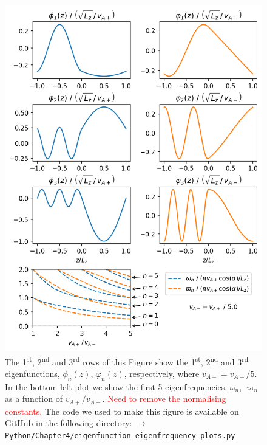 \begin{figure}
    \centering
    \vspace{-20pt}
    \includegraphics[width=\textwidth,height=0.9\textheight,keepaspectratio]{figures/chapter04/eigenfunctions_and_eigenfrequencies.png}
    \vspace{-10pt}
    \caption{The 1\textsuperscript{st}, 2\textsuperscript{nd} and 3\textsuperscript{rd} rows of this Figure show the 1\textsuperscript{st}, 2\textsuperscript{nd} and 3\textsuperscript{rd} eigenfunctions, $\phi_n(z)$, $\varphi_n(z)$, respectively, where $v_{A-}=v_{A+}/5$. In the bottom-left plot we show the first 5 eigenfrequencies, $\omega_n$, $\varpi_n$ as a function of $v_{A+} / v_{A-}$. \textcolor{red}{Need to remove the normalising constants.} The code we used to make this figure is available on GitHub in the following directory:\newline
    \texttt{$\rightarrow$ Python/Chapter4/eigenfunction\_eigenfrequency\_plots.py}}
    \vspace{-20pt}
    \label{fig:eigenfunctions_and_eigenfrequencies}
\end{figure}

